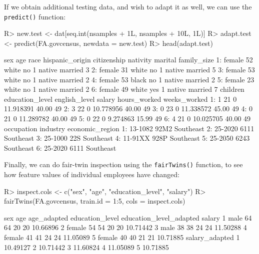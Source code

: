 \documentclass[
  notitle]{jss}
\begin{document}
If we obtain additional testing data, and wish to adapt it as well, we
can use the \texttt{predict()} function:

\begin{CodeChunk}
\begin{CodeInput}
R> new.test <- dat[seq.int(nsamples + 1L, nsamples + 10L, 1L)]
R> adapt.test <- predict(FA.govcensus, newdata = new.test)
R> head(adapt.test)
\end{CodeInput}
\begin{CodeOutput}
      sex age  race hispanic_origin citizenship nativity marital family_size
1: female  52 white              no           1   native married           3
2: female  31 white              no           1   native married           5
3: female  53 white              no           1   native married           2
4: female  53 black              no           1   native married           2
5: female  23 white              no           1   native married           2
6: female  49 white             yes           1   native married           7
   children education_level english_level    salary hours_worked weeks_worked
1:        1              21             0 11.918391        40.00           49
2:        3              22             0 10.778956        40.00           49
3:        0              23             0 11.338572        45.00           49
4:        0              21             0 11.289782        40.00           49
5:        0              22             0  9.274863        15.99           49
6:        4              21             0 10.025705        40.00           49
   occupation industry economic_region
1:    13-1082     92M2       Southeast
2:    25-2020     6111       Southeast
3:    25-1000      22S       Southeast
4:    11-91XX     928P       Southeast
5:    25-2050     6243       Southeast
6:    25-2020     6111       Southeast
\end{CodeOutput}
\end{CodeChunk}

Finally, we can do fair-twin inspection using the \texttt{fairTwins()}
function, to see how feature values of individual employees have
changed:

\begin{CodeChunk}
\begin{CodeInput}
R> inspect.cols <- c("sex", "age", "education_level", "salary")
R> fairTwins(FA.govcensus, train.id = 1:5, cols = inspect.cols)
\end{CodeInput}
\begin{CodeOutput}
     sex age age_adapted education_level education_level_adapted   salary
1   male  64          64              20                      20 10.66896
2 female  54          54              20                      20 10.71442
3   male  38          38              24                      24 11.50288
4 female  41          41              24                      24 11.05089
5 female  40          40              21                      21 10.71885
  salary_adapted
1       10.49127
2       10.71442
3       11.60824
4       11.05089
5       10.71885
\end{CodeOutput}
\end{CodeChunk}
\end{document}
